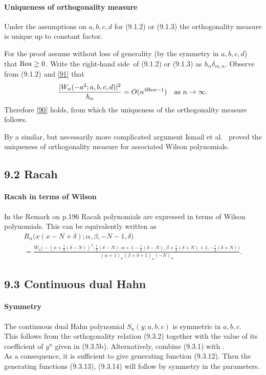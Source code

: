 \documentclass[twoside,11pt]{article}
\newcommand\al\alpha
\newcommand\be\beta
\newcommand\de\delta
\newcommand\half{\frac12}
\newcommand\thalf{\tfrac12}
\newcommand\iy\infty
\newcommand\RHS{right-hand side}
\renewcommand\Re{{\rm Re} }
\begin{document}
\paragraph{Uniqueness of orthogonality measure}
Under the assumptions on $a,b,c,d$ for (9.1.2) or (9.1.3) the orthogonality
measure is unique up to constant factor.

For the proof assume without
loss of generality (by the symmetry in $a,b,c,d$) that $\Re a\ge0$.
Write the \RHS\ of (9.1.2) or (9.1.3) as $h_n\de_{m,n}$.
Observe from (9.1.2) and \eqref{91} that
\[
\frac{|W_n(-a^2;a,b,c,d)|^2}{h_n} = O(n^{4\Re a-1})\quad\hbox{as $n\to\iy$.}
\]
Therefore \eqref{90} holds, from which the uniqueness of the orthogonality
measure follows.

By a similar, but necessarily more complicated argument Ismail et al.\
 proved the uniqueness of orthogonality measure for
associated Wilson polynomials.
%
\subsection*{9.2 Racah}
\label{sec9.2}
\paragraph{Racah in terms of Wilson}
In the Remark on p.196 Racah polynomials are expressed in terms of
Wilson polynomials. This can be equivalently written as
\begin{multline}
R_n\big(x(x-N+\de);\al,\be,-N-1,\de\big)\\
=\frac{W_n\big(-(x+\thalf(\de-N))^2;\thalf(\de-N),\al+1-\thalf(\de-N),
\be+\thalf(\de+N)+1,-\half(\de+N)\big)}
{(\al+1)_n (\be+\de+1)_n (-N)_n} .
\label{146}
\end{multline}
%
\subsection*{9.3 Continuous dual Hahn}
\label{sec9.3}
%
\paragraph{Symmetry}
The continuous dual Hahn polynomial $S_n(y;a,b,c)$ is symmetric
in $a,b,c$.\\
This follows from the orthogonality relation (9.3.2)
together with the value of its coefficient of $y^n$ given in (9.3.5b).
Alternatively, combine (9.3.1) with \mycite{AAR}{Corollary 3.3.5}.\\
As a consequence, it is sufficient to give generating function (9.3.12). Then the generating
functions (9.3.13), (9.3.14) will follow by symmetry in the parameters.
%
\end{document}
